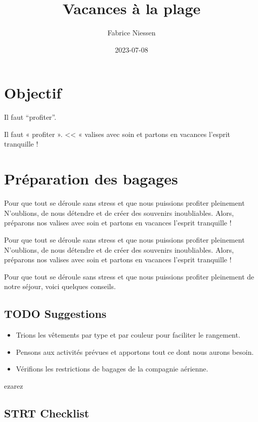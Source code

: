 \documentclass[11pt]{article}
\author{Fabrice Niessen}
\date{2023-07-08}
\title{Vacances à la plage}
\begin{document}
\maketitle
\setcounter{tocdepth}{2}
\tableofcontents


\section{Objectif}
\label{sec:orgfb58387}

Il faut ``profiter''.

Il faut « profiter ».
<<  «
valises avec soin et partons en vacances l'esprit tranquille !

\section{Préparation des bagages}
\label{sec:org375ac94}

Pour que tout se déroule sans stress et que nous puissions profiter pleinement
N'oublions, de
nous détendre et de créer des souvenirs inoubliables. Alors, préparons nos
valises avec soin et partons en vacances l'esprit tranquille !


Pour que tout se déroule sans stress et que nous puissions profiter pleinement
N'oublions, de
nous détendre et de créer des souvenirs inoubliables. Alors, préparons nos
valises avec soin et partons en vacances l'esprit tranquille !


Pour que tout se déroule sans stress et que nous puissions profiter pleinement
de notre séjour, voici quelques conseils.

\subsection{{\color{red}\textbf{\textsc{\textsf{TODO}}}} Suggestions}
\label{sec:orgc7f7374}

\begin{itemize}
\item Trions les vêtements par type et par couleur pour faciliter le rangement.
\item Pensons aux activités prévues et apportons tout ce dont nous aurons besoin.
\item Vérifions les restrictions de bagages de la compagnie aérienne.
\end{itemize}

ezarez

\subsection{{\color{red}\textbf{\textsc{\textsf{STRT}}}} Checklist}
\label{sec:org157f2c9}
\end{document}
